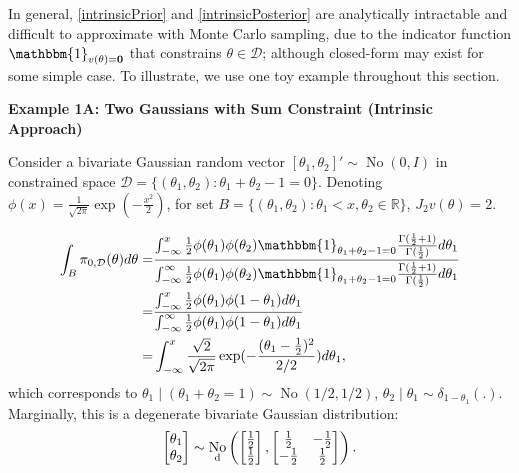 \documentclass[10pt]{article}
\newcommand{\mc}[1]{\mathcal{#1}}
\DeclareMathOperator{\No}{No}
\DeclareMathOperator{\1}{\mathbbm{1}}
\begin{document}
In general, \eqref{intrinsicPrior} and \eqref{intrinsicPosterior} are analytically intractable and difficult to approximate with Monte Carlo sampling, due to the indicator function $\mathbbm{1}_{v({\theta})={\bf 0}}$ that constrains $\theta\in \mc D$; although closed-form may exist for some simple case. To illustrate, we use one toy example throughout this section.

{\bf Example 1A: Two Gaussians with Sum Constraint (Intrinsic Approach)}

Consider a bivariate Gaussian random vector $[\theta_1,\theta_2]' \sim \No(0,I)$ in constrained space $\mc D=\{(\theta_1,\theta_2):\theta_1+\theta_2-1=0\}$. Denoting $\phi(x)= \frac{1}{\sqrt{2\pi}} \exp(-\frac{x^2}{2})$, for set $B= \{(\theta_1,\theta_2): \theta_1< x, \theta_2\in \mathbb R\}$, $J_2v(\theta)=2$.

\begin{equation*}
	\begin{aligned}
\int_{B} \pi_{0,\mc D}(\theta) d\theta= 
& \frac{
\int_{-\infty}^{x} \frac{1}{2}\phi(\theta_1)\phi(\theta_2)\mathbbm{1}_{\theta_1+\theta_2-1=0} \frac{\Gamma(\frac{1}{2}+1)}{\Gamma(\frac{1}{2})}  d\theta_1  
}{\int_{-\infty}^{\infty}\frac{1}{2}\phi(\theta_1)\phi(\theta_2) \mathbbm{1}_{\theta_1+\theta_2-1=0}  \frac{\Gamma(\frac{1}{2}+1)}{\Gamma(\frac{1}{2})}   d\theta_1} \\ 
=& \frac{
\int_{-\infty}^{x}\frac{1}{2}\phi(\theta_1)\phi(1-\theta_1)d\theta_1  
}{
\int_{-\infty}^{\infty}\frac{1}{2}\phi(\theta_1)\phi(1-\theta_1)d\theta_1  } \\ 
= & \int_{-\infty}^{x} \frac{\sqrt{2}}{\sqrt{2\pi}} \exp(-\frac{(\theta_1-\frac{1}{2})^2}{2/2}) d\theta_1,
\end{aligned}
\end{equation*}
which corresponds to $\theta_1\mid (\theta_1+ \theta_2=1) \sim \No(1/2,1/2)$, $\theta_2\mid \theta_1 \sim \delta_{1-\theta_1}(.)$. Marginally, this is a degenerate bivariate Gaussian distribution:
$$\begin{bmatrix} \theta_1 \\ \theta_2 \end{bmatrix} \sim
\No_{\text d} \left(
 \begin{bmatrix} \frac{1}{2} \\ \frac{1}{2} \end{bmatrix},
\begin{bmatrix} \frac{1}{2} & -\frac{1}{2}  \\  -\frac{1}{2}  & \frac{1}{2} \end{bmatrix}
\right).$$
\end{document}
